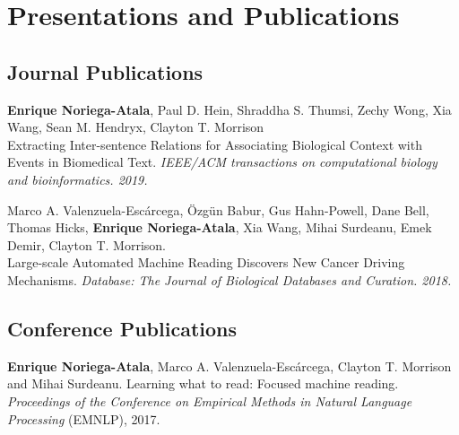 \documentclass[letterpaper]{article}
\renewenvironment{itemize}{
  \begin{list}{}{
    \setlength{\leftmargin}{1.5em}
  }
}{
  \end{list}
}
\begin{document}
\section*{Presentations and Publications}

\subsection*{Journal Publications}
\begin{itemize}
	\item \textbf{Enrique Noriega-Atala}, Paul D. Hein, Shraddha S. Thumsi, Zechy Wong, Xia Wang, Sean M. Hendryx, Clayton T. Morrison\\ Extracting Inter-sentence Relations for Associating Biological Context with Events in Biomedical Text. \textit{IEEE/ACM transactions on computational biology and bioinformatics. 2019.}
	\item Marco A. Valenzuela-Esc\'{a}rcega, \"{O}zg\"{u}n Babur, Gus Hahn-Powell, Dane Bell, Thomas Hicks, \textbf{Enrique Noriega-Atala}, Xia Wang, Mihai Surdeanu, Emek Demir, Clayton T. Morrison. \\ Large-scale Automated Machine Reading Discovers New Cancer Driving Mechanisms. \textit{Database: The Journal of Biological Databases and Curation. 2018.} 
\end{itemize}

\subsection*{Conference Publications}
\begin{itemize}
\item \textbf{Enrique Noriega-Atala}, Marco A. Valenzuela-Esc\'{a}rcega, Clayton T. Morrison and Mihai Surdeanu. Learning what to read: Focused machine reading. \textit{Proceedings of the Conference on Empirical Methods in Natural Language Processing} (EMNLP), 2017.
\end{itemize}
\end{document}
